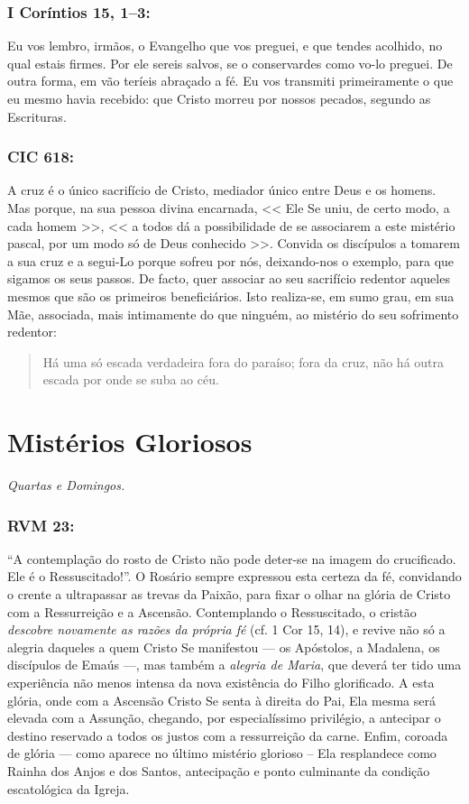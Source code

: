 \documentclass[10pt,a5paper]{book}
\newcommand{\from}[1]{\subsection*{#1}}
\begin{document}
\from{I Coríntios 15, 1--3:}

Eu vos lembro, irmãos, o Evangelho que vos preguei, e que tendes acolhido, no qual estais firmes.
Por ele sereis salvos, se o conservardes como vo-lo preguei. De outra forma, em vão teríeis abraçado a fé.
Eu vos transmiti primeiramente o que eu mesmo havia recebido: que Cristo morreu por nossos pecados, segundo as Escrituras.

\from{CIC 618:}

A cruz é o único sacrifício de Cristo, mediador único entre Deus e os homens.
Mas porque, na sua pessoa divina encarnada,
<< Ele Se uniu, de certo modo, a cada homem >>, << a todos dá a possibilidade de se associarem a este mistério pascal, por um modo só de Deus conhecido >>.
Convida os discípulos a tomarem a sua cruz e a segui-Lo porque sofreu por nós, deixando-nos o exemplo, para que sigamos os seus passos.
De facto, quer associar ao seu sacrifício redentor aqueles mesmos que são os primeiros beneficiários.
Isto realiza-se, em sumo grau, em sua Mãe, associada, mais intimamente do que ninguém, ao mistério do seu sofrimento redentor:
\begin{quote}
Há uma só escada verdadeira fora do paraíso; fora da cruz, não há outra escada por onde se suba ao céu.
\end{quote}


\chapter{Mistérios Gloriosos}

\emph{Quartas e Domingos.}

\from{RVM 23:}

``A contemplação do rosto de Cristo não pode deter-se na imagem do crucificado.
Ele é o Ressuscitado!''.
O Rosário sempre expressou esta certeza da fé, convidando o crente a ultrapassar as trevas da Paixão, para fixar o olhar na glória de Cristo com a Ressurreição e a Ascensão.
Contemplando o Ressuscitado, o cristão \emph{descobre novamente as razões da própria fé} (cf. 1 Cor 15, 14), e revive não só a alegria daqueles a quem Cristo Se manifestou --- os Apóstolos,
a Madalena, os discípulos de Emaús ---, mas também a \emph{alegria de Maria}, que deverá ter tido uma experiência não menos intensa da nova existência do Filho glorificado.
A esta glória, onde com a Ascensão Cristo Se senta à direita do Pai, Ela mesma será elevada com a Assunção, chegando, por especialíssimo privilégio, a antecipar o destino reservado a todos os justos com a
ressurreição da carne.
Enfim, coroada de glória --- como aparece no último mistério glorioso -- Ela resplandece como Rainha dos Anjos e dos Santos, antecipação e ponto culminante da condição escatológica da Igreja.
\end{document}
